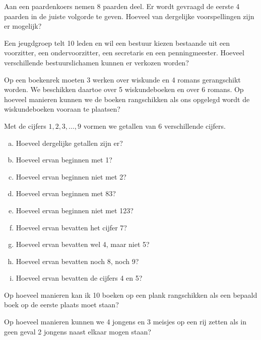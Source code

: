 \documentclass[12pt,a4paper,twoside]{article}
\begin{document}
\begin{oefening}
Aan een paardenkoers nemen 8 paarden deel. Er wordt gevraagd de eerste 4 paarden in de juiste volgorde te geven. Hoeveel van dergelijke voorspellingen zijn er mogelijk?
\end{oefening}

\begin{oefening}
Een jeugdgroep telt 10 leden en wil een bestuur kiezen bestaande uit een voorzitter, een ondervoorzitter, een secretaris en een penningmeester. Hoeveel verschillende bestuurslichamen kunnen er verkozen worden?
\end{oefening}

\begin{oefening}
Op een boekenrek moeten 3 werken over wiskunde en 4 romans gerangschikt worden. We beschikken daartoe over 5 wiskundeboeken en over 6 romans. Op hoeveel manieren kunnen we de boeken rangschikken als ons opgelegd wordt de wiskundeboeken vooraan te plaatsen?
\end{oefening}

\begin{oefening}
Met de cijfers $1, 2, 3, \ldots, 9$ vormen we getallen van $6$ verschillende cijfers.
\begin{enumerate}[(a)]
  \item Hoeveel dergelijke getallen zijn er?
  \item Hoeveel ervan beginnen met 1?
  \item Hoeveel ervan beginnen niet met 2?
  \item Hoeveel ervan beginnen met 83?
  \item Hoeveel ervan beginnen niet met 123?
  \item Hoeveel ervan bevatten het cijfer 7?
  \item Hoeveel ervan bevatten wel 4, maar niet 5?
  \item Hoeveel ervan bevatten noch 8, noch 9?
  \item Hoeveel ervan bevatten de cijfers 4 en 5?
\end{enumerate}
\end{oefening}

\begin{oefening}
Op hoeveel manieren kan ik 10 boeken op een plank rangschikken als een bepaald boek op de eerste plaats moet staan?
\end{oefening}

\begin{oefening}
Op hoeveel manieren kunnen we 4 jongens en 3 meisjes op een rij zetten als in geen geval 2 jongens naast elkaar mogen staan?
\end{oefening}
\end{document}
